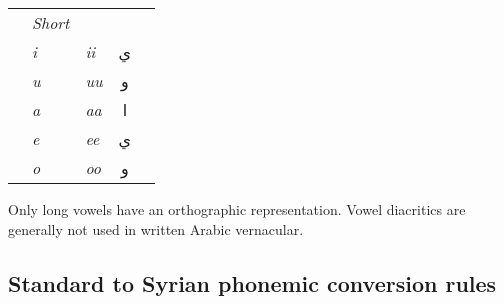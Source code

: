 \documentclass[oneside,a4paper]{article}
\begin{document}
\begin{multicols}{2}

  \begin{tabularx}{\linewidth}{X>{\itshape}l>{\itshape}lcX}

    & \upshape Short & \multicolumn{2}{l}{Long} & \\
    & i              & ii                       & \textarabic{ي} & \\
    & u              & uu                       & \textarabic{و} & \\
    & a              & aa                       & \textarabic{ا} & \\
    & e              & ee                       & \textarabic{ي} & \\
    & o              & oo                       & \textarabic{و} & \\

  \end{tabularx}

Only long vowels have an orthographic representation. Vowel diacritics are generally not used in written Arabic vernacular.

\end{multicols}

\subsection{Standard to Syrian phonemic conversion rules}\label{subsec:converston}
\end{document}
